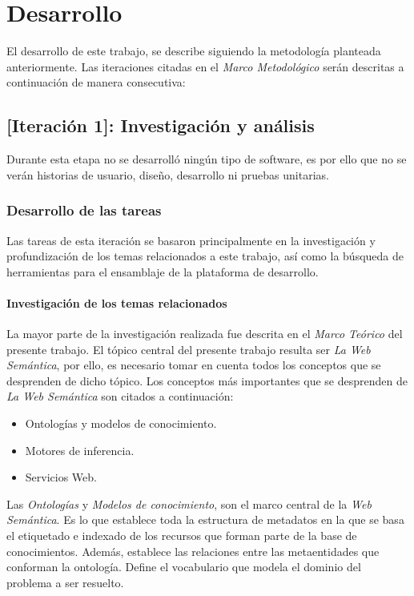 \chapter{Desarrollo}
\label{chap:desarrollo}

El desarrollo de este trabajo, se describe siguiendo la metodología planteada anteriormente. Las iteraciones citadas en el \textit{Marco Metodológico} serán descritas a continuación de manera consecutiva:

\section{[Iteración 1]: Investigación y análisis}
Durante esta etapa no se desarrolló ningún tipo de software, es por ello que no se verán historias de usuario, diseño, desarrollo ni pruebas unitarias.

\subsection{Desarrollo de las tareas}
Las tareas de esta iteración se basaron principalmente en la investigación y profundización de los temas relacionados a este trabajo, así como la búsqueda de herramientas para el ensamblaje de la plataforma de desarrollo.

\subsubsection{Investigación de los temas relacionados}
La mayor parte de la investigación realizada fue descrita en el \textit{Marco Teórico} del presente trabajo. El tópico central del presente trabajo resulta ser \textit{La Web Semántica}, por ello, es necesario tomar en cuenta todos los conceptos que se desprenden de dicho tópico. Los conceptos más importantes que se desprenden de \textit{La Web Semántica} son citados a continuación:

\begin{itemize}
\item Ontologías y modelos de conocimiento.
\item Motores de inferencia.
\item Servicios Web.
\end{itemize}

Las \textit{Ontologías} y \textit{Modelos de conocimiento}, son el marco central de la \textit{Web Semántica}. Es lo que establece toda la estructura de metadatos en la que se basa el etiquetado e indexado de los recursos que forman parte de la base de conocimientos. Además, establece las relaciones entre las metaentidades que conforman la ontología. Define el vocabulario que modela el dominio del problema a ser resuelto.


